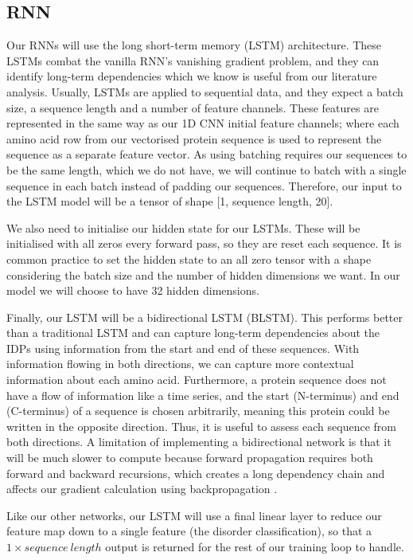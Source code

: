 \documentclass{l4proj}
\begin{document}
\subsection{RNN}
\label{chap:design section:rnn}

Our RNNs will use the long short-term memory (LSTM) architecture. These LSTMs combat the vanilla RNN’s vanishing gradient problem, and they can identify long-term dependencies which we know is useful from our literature analysis. Usually, LSTMs are applied to sequential data, and they expect a batch size, a sequence length and a number of feature channels. These features are represented in the same way as our 1D CNN initial feature channels; where each amino acid row from our vectorised protein sequence is used to represent the sequence as a separate feature vector. As using batching requires our sequences to be the same length, which we do not have, we will continue to batch with a single sequence in each batch instead of padding our sequences. Therefore, our input to the LSTM model will be a tensor of shape [1, sequence length, 20]. 

We also need to initialise our hidden state for our LSTMs. These will be initialised with all zeros every forward pass, so they are reset each sequence. It is common practice to set the hidden state to an all zero tensor with a shape considering the batch size and the number of hidden dimensions we want. In our model we will choose to have 32 hidden dimensions. 

Finally, our LSTM will be a bidirectional LSTM (BLSTM). This performs better than a traditional LSTM and can capture long-term dependencies about the IDPs using information from the start and end of these sequences. With information flowing in both directions, we can capture more contextual information about each amino acid. Furthermore, a protein sequence does not have a flow of information like a time series, and the start (N-terminus) and end (C-terminus) of a sequence is chosen arbitrarily, meaning this protein could be written in the opposite direction. Thus, it is useful to assess each sequence from both directions. A limitation of implementing a bidirectional network is that it will be much slower to compute because forward propagation requires both forward and backward recursions, which creates a long dependency chain and affects our gradient calculation using backpropagation \citep{Zhang:2021}.  

Like our other networks, our LSTM will use a final linear layer to reduce our feature map down to a single feature (the disorder classification), so that a $1\times sequence\ length$ output is returned for the rest of our training loop to handle.
\end{document}
